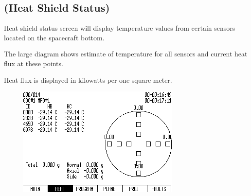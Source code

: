 \subsection{ (Heat Shield Status)}
Heat shield status screen will display temperature values from certain sensors located on the spacecraft bottom.

The large diagram shows estimate of temperature for all sensors and current heat flux at these points.

Heat flux is displayed in kilowatts per one square meter.

\begin{figure}[htb]
\centering
\includegraphics[bb=0 0 9cm 7cm,scale=0.50]{../graphics/rv550_screen10.png}
\end{figure}

